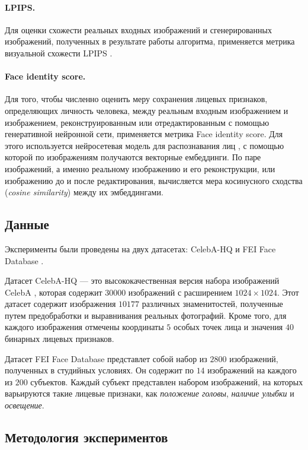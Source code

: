 \paragraph{LPIPS.}
Для оценки схожести реальных входных изображений и сгенерированных изображений, полученных в результате работы алгоритма, применяется метрика визуальной схожести LPIPS \cite{zhang2018lpips}.

\paragraph{Face identity score.}
Для того, чтобы численно оценить меру сохранения лицевых признаков, определяющих личность человека, между реальным входным изображением и изображением, реконструированным или отредактированным с помощью генеративной нейронной сети, применяется метрика Face identity score.
Для этого используется нейросетевая модель для распознавания лиц \cite{deng2018arcface}, с помощью которой по изображениям получаются векторные ембеддинги.
По паре изображений, а именно реальному изображению и его реконструкции, или изображению до и после редактирования, вычисляется мера косинусного сходства (\emph{cosine similarity}) между их эмбеддингами.


\subsection{Данные}
Эксперименты были проведены на двух датасетах: CelebA-HQ \cite{progressive-growing-gan} и FEI Face Database \cite{fei-database}.

Датасет CelebA-HQ --- это высококачественная версия набора изображений CelebA \cite{liu2015celeba}, которая содержит $30000$ изображений с расширением $1024\times1024$.
Этот датасет содержит изображения $10177$ различных знаменитостей, полученные путем предобработки и выравнивания реальных фотографий.
Кроме того, для каждого изображения отмечены координаты $5$ особых точек лица и значения $40$ бинарных лицевых признаков.

Датасет FEI Face Database представлет собой набор из $2800$ изображений, полученных в студийных условиях.
Он содержит по $14$ изображений на каждого из $200$ субъектов.
Каждый субъект представлен набором изображений, на которых варьируются такие лицевые признаки, как \emph{положение головы}, \emph{наличие улыбки} и \emph{освещение}.


\subsection{Методология экспериментов}

